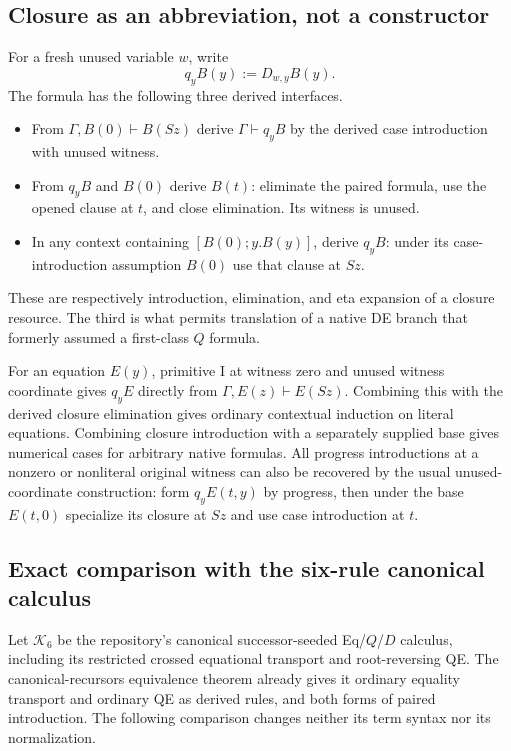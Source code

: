 \subsection{Closure as an abbreviation, not a constructor}

For a fresh unused variable $w$, write
\[
 q_yB(y):=D_{w,y}B(y).
\]
The formula has the following three derived interfaces.
\begin{itemize}
\item From $\Gamma,B(0)\vdash B(Sz)$ derive $\Gamma\vdash q_yB$ by
the derived case introduction with unused witness.
\item From $q_yB$ and $B(0)$ derive $B(t)$: eliminate the paired formula,
use the opened clause at $t$, and close elimination. Its witness is unused.
\item In any context containing $[B(0);y.B(y)]$, derive $q_yB$: under
its case-introduction assumption $B(0)$ use that clause at $Sz$.
\end{itemize}
These are respectively introduction, elimination, and eta expansion of a
closure resource. The third is what permits translation of a native DE
branch that formerly assumed a first-class $Q$ formula.

For an equation $E(y)$, primitive I at witness zero and unused witness
coordinate gives $q_yE$ directly from
$\Gamma,E(z)\vdash E(Sz)$. Combining this with the derived closure
elimination gives ordinary contextual induction on literal equations.
Combining closure introduction with a separately supplied base gives
numerical cases for arbitrary native formulas. All progress introductions
at a nonzero or nonliteral original witness can also be recovered by the
usual unused-coordinate construction: form $q_yE(t,y)$ by progress, then
under the base $E(t,0)$ specialize its closure at $Sz$ and use case
introduction at $t$.

\subsection{Exact comparison with the six-rule canonical calculus}

Let $\mathcal K_6$ be the repository's canonical successor-seeded Eq/$Q$/$D$
calculus, including its restricted crossed equational transport and
root-reversing QE. The canonical-recursors equivalence theorem already
gives it ordinary equality transport and ordinary QE as derived rules,
and both forms of paired introduction. The following comparison changes
neither its term syntax nor its normalization.

